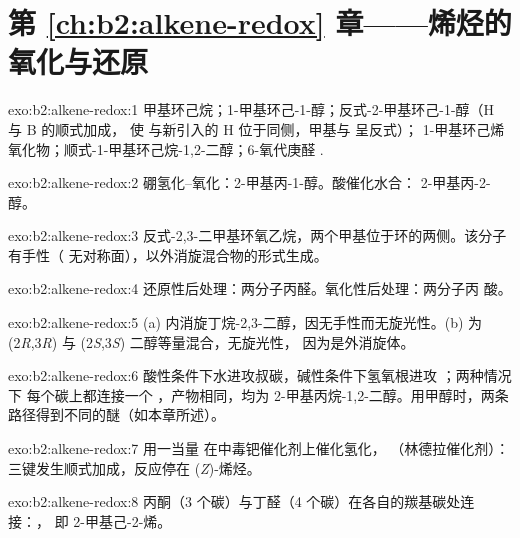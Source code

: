 \section*{第 \ref{ch:b2:alkene-redox} 章——烯烃的氧化与还原}

\begin{solution}{exo:b2:alkene-redox:1}
甲基环己烷；1-甲基环己-1-醇；反式-2-甲基环己-1-醇（H 与 B 的顺式加成，
使  与新引入的 H 位于同侧，甲基与  呈反式）；
1-甲基环己烯氧化物；顺式-1-甲基环己烷-1,2-二醇；6-氧代庚醛
.
\end{solution}

\begin{solution}{exo:b2:alkene-redox:2}
硼氢化–氧化：2-甲基丙-1-醇。酸催化水合：
2-甲基丙-2-醇。
\end{solution}

\begin{solution}{exo:b2:alkene-redox:3}
反式-2,3-二甲基环氧乙烷，两个甲基位于环的两侧。该分子有手性（
无对称面），以外消旋混合物的形式生成。
\end{solution}

\begin{solution}{exo:b2:alkene-redox:4}
还原性后处理：两分子丙醛。氧化性后处理：两分子丙
酸。
\end{solution}

\begin{solution}{exo:b2:alkene-redox:5}
(a) 内消旋丁烷-2,3-二醇，因无手性而无旋光性。(b) 为
(2\textit{R},3\textit{R}) 与 (2\textit{S},3\textit{S}) 二醇等量混合，无旋光性，
因为是外消旋体。
\end{solution}

\begin{solution}{exo:b2:alkene-redox:6}
酸性条件下水进攻叔碳，碱性条件下氢氧根进攻 ；两种情况下
每个碳上都连接一个 ，产物相同，均为 2-甲基丙烷-1,2-二醇。用甲醇时，两条
路径得到不同的醚（如本章所述）。
\end{solution}

\begin{solution}{exo:b2:alkene-redox:7}
用一当量  在中毒钯催化剂上催化氢化，
（林德拉催化剂）：三键发生顺式加成，反应停在 (\textit{Z})-烯烃。
\end{solution}

\begin{solution}{exo:b2:alkene-redox:8}
丙酮（3 个碳）与丁醛（4 个碳）在各自的羰基碳处连接：，
即 2-甲基己-2-烯。
\end{solution}

